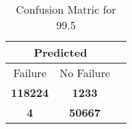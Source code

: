 \begin{table}[] 
\caption{Confusion Matric for 99.5} 
\label{Table: Prediction Accuracy-DMD99.5OnlySunEKF-resetReflectionEKF-top2perfectNoFailurePrediction-Reflection} 
\centering 
\begin{tabular} 
 {@{}ccc@{}} 
\toprule 
\multicolumn{2}{c}{\textbf{Predicted}}
 \\ \midrule 
\multicolumn{1}{|c|}{Failure} & 
\multicolumn{1}{c|}{No Failure}
 \\ \midrule 
\multicolumn{1}{|c|}{\color{green}\textbf{118224}} & 
\multicolumn{1}{c|}{\color{red}\textbf{1233}}
 \\ \midrule 
\multicolumn{1}{|c|}{\color{red}\textbf{4}} & 
\multicolumn{1}{c|}{\color{green}\textbf{50667}}
 \\ \bottomrule 
\end{tabular} 
\end{table} 
